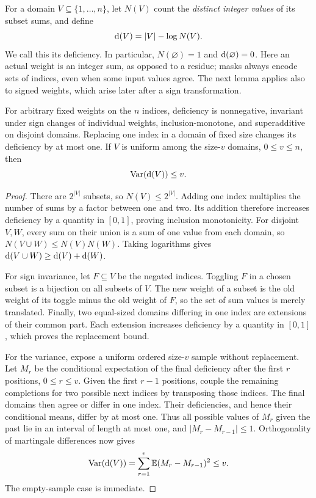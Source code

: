 For a domain $V\subseteq\{1,\ldots,n\}$, let $N(V)$ count the
\emph{distinct integer values} of its subset sums, and define
\[
 \mathrm{d}(V)=|V|-\log N(V).
\]
We call this its deficiency. In particular, $N(\varnothing)=1$ and
$\mathrm{d}(\varnothing)=0$. Here an actual weight is an integer sum,
as opposed to a residue; masks always encode sets of indices, even
when some input values agree. The next lemma applies also to signed
weights, which arise later after a sign transformation.

\begin{lemma}[Deficiency]
\label{lem:deficiency}
For arbitrary fixed weights on the $n$ indices, deficiency is
nonnegative, invariant under sign changes of individual weights,
inclusion-monotone, and superadditive on disjoint domains. Replacing
one index in a domain of fixed size changes its deficiency by at most
one. If $V$ is uniform among the size-$v$ domains, $0\le v\le n$,
then
\begin{equation}
\label{eq:deficiency-variance}
 \operatorname{Var}(\mathrm{d}(V))\le v.
\end{equation}
\end{lemma}

\begin{proof}
There are $2^{|V|}$ subsets, so $N(V)\le2^{|V|}$.
Adding one index multiplies the number of sums by a factor between
one and two. Its addition therefore increases deficiency by a quantity
in $[0,1]$, proving inclusion monotonicity. For disjoint $V,W$,
every sum on their union is a sum of one value from each domain, so
$N(V\cup W)\le N(V)N(W)$. Taking logarithms gives
$\mathrm{d}(V\cup W)\ge\mathrm{d}(V)+\mathrm{d}(W)$.

For sign invariance, let $F\subseteq V$ be the negated indices.
Toggling $F$ in a chosen subset is a bijection on all subsets of $V$.
The new weight of a subset is the old weight of its toggle minus the
old weight of $F$, so the set of sum values is merely translated.
Finally, two equal-sized domains differing in one index are extensions
of their common part. Each extension increases deficiency by a
quantity in $[0,1]$, which proves the replacement bound.

For the variance, expose a uniform ordered size-$v$ sample without
replacement. Let $M_r$ be the conditional expectation of the final
deficiency after the first $r$ positions, $0\le r\le v$.
Given the first $r-1$ positions, couple the remaining completions for
two possible next indices by transposing those indices. The final
domains then agree or differ in one index. Their deficiencies, and
hence their conditional means, differ by at most one. Thus all
possible values of $M_r$ given the past lie in an interval of length
at most one, and $|M_r-M_{r-1}|\le1$. Orthogonality of martingale
differences now gives
\[
 \operatorname{Var}(\mathrm{d}(V))
 =\sum_{r=1}^v\mathbb E(M_r-M_{r-1})^2\le v.
\]
The empty-sample case is immediate.
\end{proof}


